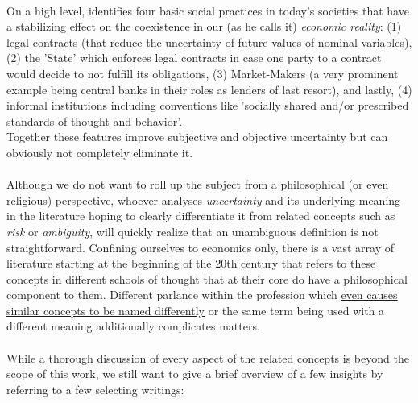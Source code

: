 \documentclass[a4paper,12pt,oneside,pointednumbers,bibtotoc,bigheadings,liststotoc]{scrbook}
\begin{document}
\\
On a high level, \citet{dequesh:00} identifies four basic social practices in today's societies that have a stabilizing effect on the coexistence in our (as  he calls it) \textit{economic reality}: (1) legal contracts (that reduce the uncertainty of future values of nominal variables), (2) the 'State' which enforces legal contracts in case one party to a contract would decide to not fulfill its obligations, (3) Market-Makers (a very prominent example being central banks in their roles as lenders of last resort), and lastly, (4) informal institutions including conventions like 'socially shared and/or prescribed standards of thought and behavior'. \\
Together these features improve subjective and objective uncertainty but can obviously not completely eliminate it. \\
\\
Although we do not want to roll up the subject from a philosophical (or even religious) perspective, whoever analyses \textit{uncertainty} and its underlying meaning in the literature hoping to clearly differentiate it from related concepts such as \textit{risk} or \textit{ambiguity}, will quickly realize that an unambiguous definition is not straightforward. Confining ourselves to economics only, there is a vast array of literature starting at the beginning of the 20th century that refers to these concepts in different schools of thought that at their core do have a philosophical component to them. Different parlance within the profession which \href{http://www.economics-ejournal.org/economics/discussionpapers/2015-36/file}{even causes similar concepts to be named differently} or the same term being used with a different meaning additionally complicates matters.\\
\\
While a thorough discussion of every aspect of the related concepts is beyond the scope of this work, we still want to give a brief overview of a few insights by referring to a few selecting writings:\\
\end{document}
